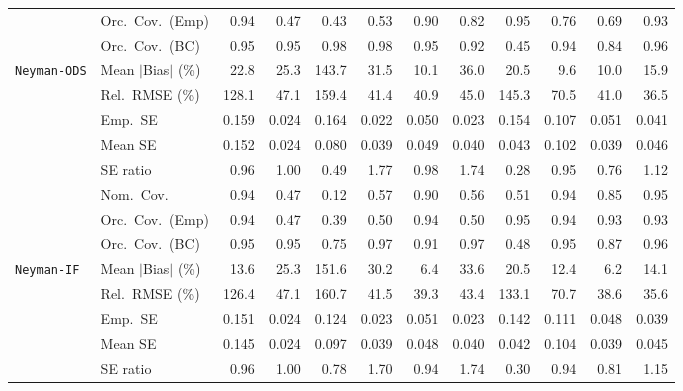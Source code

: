 \begin{landscape}
\begin{longtable}{llrrrrrrrrrr}
 & Orc.\ Cov.\ (Emp) & \cellcolor{ranktwo}0.94 & 0.47 & 0.43 & 0.53 & 0.90 & 0.82 & \cellcolor{rankone}0.95 & 0.76 & 0.69 & \cellcolor{rankthree}0.93 \\
 & Orc.\ Cov.\ (BC) & \cellcolor{rankone}0.95 & \cellcolor{rankthree}0.95 & 0.98 & 0.98 & \cellcolor{ranktwo}0.95 & 0.92 & 0.45 & 0.94 & 0.84 & 0.96 \\
\addlinespace[2pt]
\quad \texttt{Neyman-ODS} & Mean $|$Bias$|$ (\%) & 22.8 & 25.3 & 143.7 & 31.5 & \cellcolor{rankthree}10.1 & 36.0 & 20.5 & \cellcolor{rankone}9.6 & \cellcolor{ranktwo}10.0 & 15.9 \\
 & Rel.\ RMSE (\%) & 128.1 & 47.1 & 159.4 & 41.4 & \cellcolor{ranktwo}40.9 & 45.0 & 145.3 & 70.5 & \cellcolor{rankthree}41.0 & \cellcolor{rankone}36.5 \\
 & Emp.\ SE & 0.159 & 0.024 & 0.164 & 0.022 & 0.050 & 0.023 & 0.154 & 0.107 & 0.051 & 0.041 \\
 & Mean SE & 0.152 & 0.024 & 0.080 & 0.039 & 0.049 & 0.040 & 0.043 & 0.102 & 0.039 & 0.046 \\
 & SE ratio & \cellcolor{rankthree}0.96 & \cellcolor{rankone}1.00 & 0.49 & 1.77 & \cellcolor{ranktwo}0.98 & 1.74 & 0.28 & 0.95 & 0.76 & 1.12 \\
 & Nom.\ Cov. & \cellcolor{ranktwo}0.94 & 0.47 & 0.12 & 0.57 & 0.90 & 0.56 & 0.51 & \cellcolor{rankthree}0.94 & 0.85 & \cellcolor{rankone}0.95 \\
 & Orc.\ Cov.\ (Emp) & \cellcolor{rankthree}0.94 & 0.47 & 0.39 & 0.50 & 0.94 & 0.50 & \cellcolor{rankone}0.95 & \cellcolor{ranktwo}0.94 & 0.93 & 0.93 \\
 & Orc.\ Cov.\ (BC) & \cellcolor{rankone}0.95 & \cellcolor{rankthree}0.95 & 0.75 & 0.97 & 0.91 & 0.97 & 0.48 & \cellcolor{ranktwo}0.95 & 0.87 & 0.96 \\
\addlinespace[2pt]
\quad \texttt{Neyman-IF} & Mean $|$Bias$|$ (\%) & 13.6 & 25.3 & 151.6 & 30.2 & \cellcolor{ranktwo}6.4 & 33.6 & 20.5 & \cellcolor{rankthree}12.4 & \cellcolor{rankone}6.2 & 14.1 \\
 & Rel.\ RMSE (\%) & 126.4 & 47.1 & 160.7 & 41.5 & \cellcolor{rankthree}39.3 & 43.4 & 133.1 & 70.7 & \cellcolor{ranktwo}38.6 & \cellcolor{rankone}35.6 \\
 & Emp.\ SE & 0.151 & 0.024 & 0.124 & 0.023 & 0.051 & 0.023 & 0.142 & 0.111 & 0.048 & 0.039 \\
 & Mean SE & 0.145 & 0.024 & 0.097 & 0.039 & 0.048 & 0.040 & 0.042 & 0.104 & 0.039 & 0.045 \\
 & SE ratio & \cellcolor{ranktwo}0.96 & \cellcolor{rankone}1.00 & 0.78 & 1.70 & \cellcolor{rankthree}0.94 & 1.74 & 0.30 & 0.94 & 0.81 & 1.15 \\

\end{longtable}
\end{landscape}
